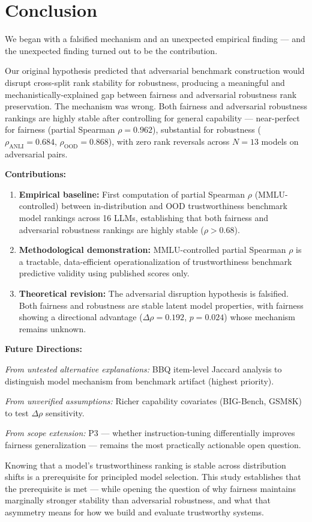\section{Conclusion}
\label{sec:conclusion}

We began with a falsified mechanism and an unexpected empirical finding --- and the unexpected finding turned out to be the contribution.

Our original hypothesis predicted that adversarial benchmark construction would disrupt cross-split rank stability for robustness, producing a meaningful and mechanistically-explained gap between fairness and adversarial robustness rank preservation. The mechanism was wrong. Both fairness and adversarial robustness rankings are highly stable after controlling for general capability --- near-perfect for fairness (partial Spearman $\rho = 0.962$), substantial for robustness ($\rho_{\text{ANLI}} = 0.684$, $\rho_{\text{OOD}} = 0.868$), with zero rank reversals across $N=13$ models on adversarial pairs.

\textbf{Contributions:}

\begin{enumerate}
\item \textbf{Empirical baseline:} First computation of partial Spearman $\rho$ (MMLU-controlled) between in-distribution and OOD trustworthiness benchmark model rankings across 16 LLMs, establishing that both fairness and adversarial robustness rankings are highly stable ($\rho > 0.68$).

\item \textbf{Methodological demonstration:} MMLU-controlled partial Spearman $\rho$ is a tractable, data-efficient operationalization of trustworthiness benchmark predictive validity using published scores only.

\item \textbf{Theoretical revision:} The adversarial disruption hypothesis is falsified. Both fairness and robustness are stable latent model properties, with fairness showing a directional advantage ($\Delta\rho = 0.192$, $p = 0.024$) whose mechanism remains unknown.
\end{enumerate}

\textbf{Future Directions:}

\emph{From untested alternative explanations:} BBQ item-level Jaccard analysis to distinguish model mechanism from benchmark artifact (highest priority).

\emph{From unverified assumptions:} Richer capability covariates (BIG-Bench, GSM8K) to test $\Delta\rho$ sensitivity.

\emph{From scope extension:} P3 --- whether instruction-tuning differentially improves fairness generalization --- remains the most practically actionable open question.

Knowing that a model's trustworthiness ranking is stable across distribution shifts is a prerequisite for principled model selection. This study establishes that the prerequisite is met --- while opening the question of why fairness maintains marginally stronger stability than adversarial robustness, and what that asymmetry means for how we build and evaluate trustworthy systems.
